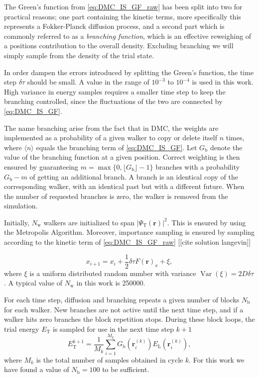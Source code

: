 The Green's function from \eqref{eq:DMC_IS_GF_raw} has been split into two for practical reasons; one part containing the kinetic terms, more specifically this represents a Fokker-Planck diffusion process, and a second part which is commonly referred to as a \textit{branching function}, which is an effective reweighing of a positions contribution to the overall density. Excluding branching we will simply sample from the density of the trial state.

In order dampen the errors introduced by splitting the Green's function, the time step $\delta\tau$ should be small. A value in the range of $10^{-3}$ to $10^{-4}$ is used in this work. High variance in energy samples requires a smaller time step to keep the branching controlled, since the fluctuations of the two are connected by \eqref{eq:DMC_IS_GF}.

The name branching arise from the fact that in DMC, the weights are implemented as a probability of a given walker to copy or delete itself $n$ times, where $\langle n \rangle$ equals the branching term of \eqref{eq:DMC_IS_GF}. Let $G_{\mathrm{b}}$ denote the value of the branching function at a given position. Correct weighting is then ensured by guaranteeing $m = \max\{0, \lfloor G_{\mathrm{b}} \rfloor - 1\}$ branches with a probability $G_{\mathrm{b}} - m$ of getting an additional branch.  A branch is an identical copy of the corresponding walker, with an identical past but with a different future. When the number of requested branches is zero, the walker is removed from the simulation.


Initially, $N_{\mathrm{w}}$ walkers are initialized to span $|\Psi_{\mathrm{T}}(\bm{r})|^2$. This is ensured by using the Metropolis Algorithm. Moreover, importance sampling is ensured by sampling according to the kinetic term of \eqref{eq:DMC_IS_GF_raw} [[cite solution langevin]]

\begin{equation}
x_{i+1} = x_i + \frac{1}{2} \delta \tau F(\bm{r})_x + \xi,
\end{equation}
where $\xi$ is a uniform distributed random number with variance $\operatorname{Var}(\xi) = 2D\delta\tau$. A typical value of $N_{\mathrm{w}}$ in this work is \num{250000}.

For each time step, diffusion and branching repeats a given number of blocks $N_{\mathrm{b}}$ for each walker. New branches are not active until the next time step, and if a walker hits zero branches the block repetition stops. During these block loops, the trial energy $E_{\mathrm{T}}$ is sampled for use in the next time step $k+1$
\begin{equation}
 E_{\mathrm{T}}^{k+1} = \frac{1}{M_k}\sum_{i=1}^{M_k} G_{\mathrm{b}}(\bm{r}^{(k)}_i)E_{\mathrm{L}}(\bm{r}^{(k)}_i),
\end{equation}
where $M_k$ is the total number of samples obtained in cycle $k$. For this work we have found a value of $N_{\mathrm{b}} = 100$ to be sufficient.

